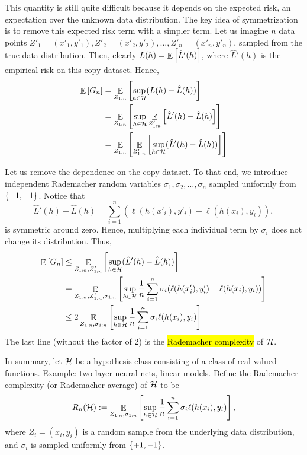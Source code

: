 This quantity is still quite difficult because it depends on the expected risk, an expectation over the unknown data distribution.
The key idea of symmetrization is to remove this expected risk term with a simpler term.
Let us imagine $n$ data points $Z'_1 = (x'_1, y'_1), Z'_2 = (x'_2, y'_2), \dots, Z'_n = (x'_n, y'_n)$, sampled from the true data distribution.
Then, clearly $L(h) = \mathop{\mathbb{E}}\left[ \hat L'(h) \right]$, where $\hat L'(h)$ is the empirical risk on this copy dataset.
Hence,
\begin{align*}
    \mathop{\mathbb{E}}\left[ G_n \right] &= \mathop{\mathbb{E}}_{Z_{1:n}}\left[ \sup_{h\in\mathcal{H}} (L(h) - \hat L(h)) \right] \\
    &= \mathop{\mathbb{E}}_{Z_{1:n}}\left[ \sup_{h \in\mathcal{H}} \mathop{\mathbb{E}}_{Z'_{1:n}}\left[ \hat L'(h) - \hat L(h) \right]  \right] \\
    &= \mathop{\mathbb{E}}_{Z_{1:n}}\left[ \mathop{\mathbb{E}}_{Z'_{1:n}}\left[ \sup_{h \in \mathcal{H}} (\hat L'(h) - \hat L(h))  \right]   \right]
\end{align*}

Let us remove the dependence on the copy dataset. To that end, we introduce independent Rademacher random variables $\sigma_1, \sigma_2, \dots, \sigma_n$ sampled uniformly from $\left\{+1, -1\right\}$.
Notice that \[ \hat L'(h) - \hat L(h) = \sum_{i=1}^n (\ell(h(x'_i), y'_i) - \ell(h(x_i), y_i)), \]
is symmetric around zero.
Hence, multiplying each individual term by $\sigma_i$ does not change its distribution.
Thus,
\begin{align}
    \mathop{\mathbb{E}}\left[ G_n \right] &\le \mathop{\mathbb{E}}_{Z_{1:n}, Z'_{1:n}}\left[ \sup_{h \in \mathcal{H}} (\hat L'(h) - \hat L(h)) \right] \notag \\
    &= \mathop{\mathbb{E}}_{Z_{1:n}, Z'_{1:n}, \sigma_{1:n}}\left[ \sup_{h\in \mathcal{H}} \frac 1 n \sum_{i=1}^n \sigma_i (\ell(h(x'_i), y'_i) - \ell(h(x_i), y_i)) \right] \notag \\
    &\le 2 \mathop{\mathbb{E}}_{Z_{1:n}, \sigma_{1:n}}\left[ \sup_{h\in\mathcal{H}}\frac 1 n \sum_{i=1}^n \sigma_i \ell(h(x_i), y_i) \right] \label{eq_Rn_rad}
\end{align}
The last line (without the factor of $2$) is the \hl{Rademacher complexity} of $\mathcal{H}$.

In summary, let $\mathcal{H}$ be a hypothesis class consisting of a class of real-valued functions. Example: two-layer neural nets, linear models.
Define the Rademacher complexity (or Rademacher average) of $\mathcal{H}$ to be
\[ R_n(\mathcal{H}) := \mathop{\mathbb{E}}_{Z_{1:n}, \sigma_{1:n}}\left[ \sup_{h\in\mathcal{H}} \frac 1 n \sum_{i=1}^n \sigma_i \ell(h(x_i), y_i) \right], \]
where $Z_i = (x_i, y_i)$ is a random sample from the underlying data distribution, and $\sigma_i$ is sampled uniformly from $\left\{+1, -1\right\}$.


